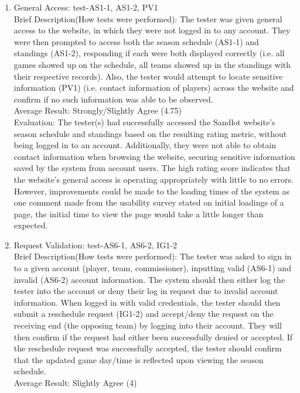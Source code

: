 \documentclass[12pt, titlepage]{article}
\begin{document}
\begin{enumerate}
  \item{General Access: test-AS1-1, AS1-2, PV1\\}
  Brief Description(How tests were performed): The tester was given general access to the
  website, in which they were not logged in to any account. They were then prompted to
  access both the season schedule (AS1-1) and standings (AS1-2), responding if each
  were both displayed correctly (i.e. all games showed up on the schedule, all teams
  showed up in the standings with their respective records). Also, the tester would attempt
  to locate sensitive information (PV1) (i.e. contact information of players) across the
  website and confirm if no such information was able to be observed. \\
  Average Result: Strongly/Slightly Agree (4.75)\\
  Evaluation: The tester(s) had successfully accessed the Sandlot website's season schedule and
  standings based on the resulting rating metric, without being logged in to an account. Additionally,
  they were not able to obtain contact information when browsing the website, securing sensitive
  information saved by the system from account users. The high rating score indicates that the
  website's general access is operating appropriately with little to no errors. However,
  improvements could be made to the loading times of the system as one comment made from the
  usability survey stated on initial loadings of a page, the initial time to view the page would
  take a little longer than expected.
  \item{Request Validation: test-AS6-1, AS6-2, IG1-2\\}
  Brief Description(How tests were performed): The tester was asked to sign in to a given
  account (player, team, commissioner), inputting valid (AS6-1) and invalid (AS6-2)
  account information. The system should then either log the tester into the account or
  deny their log in request due to invalid account information. When logged in with valid
  credentials, the tester should then submit a reschedule request (IG1-2) and accept/deny the
  request on the receiving end (the opposing team) by logging into their account. They will then
  confirm if the request had either been successfully denied or accepted. If the reschedule
  request was successfully accepted, the tester should confirm that the updated game day/time
  is reflected upon viewing the season schedule. \\
  Average Result: Slightly Agree (4)\\

\end{enumerate}
\end{document}
